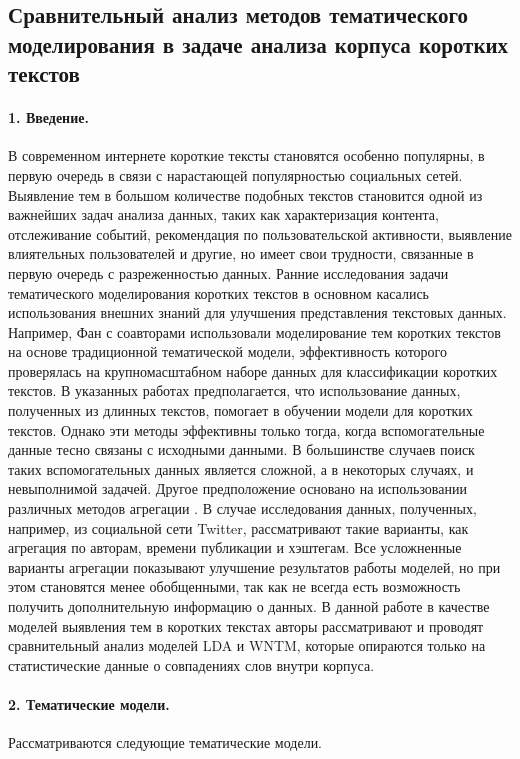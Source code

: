 \subsection{Сравнительный анализ методов тематического моделирования в задаче анализа корпуса коротких текстов}\label{subsec:ch5/sec2/sub7}

\paragraph{1. Введение.} В современном интернете короткие тексты становятся особенно популярны, в первую очередь в связи с нарастающей популярностью социальных сетей. Выявление тем в большом количестве подобных текстов становится одной из важнейших задач анализа данных, таких как характеризация контента, отслеживание событий, рекомендация по пользовательской активности, выявление влиятельных пользователей и другие, но имеет свои трудности, связанные в первую очередь с разреженностью данных. Ранние исследования задачи тематического моделирования коротких текстов в основном касались использования внешних знаний для улучшения представления текстовых данных. Например, Фан с соавторами \cite{HoriguchiPhanNguyen} использовали моделирование тем коротких текстов на основе традиционной тематической модели, эффективность которого проверялась на крупномасштабном наборе данных для классификации коротких текстов. В указанных работах предполагается, что использование данных, полученных из длинных текстов, помогает в обучении модели для коротких текстов. Однако эти методы эффективны только тогда, когда вспомогательные данные тесно связаны с исходными данными. В большинстве случаев поиск таких вспомогательных данных является сложной, а в некоторых случаях, и невыполнимой задачей. Другое предположение основано на использовании различных методов агрегации \cite{WrayLexingRishabh}. В случае исследования данных, полученных, например, из социальной сети Twitter, рассматривают такие варианты, как агрегация по авторам, времени публикации и хэштегам. Все усложненные варианты агрегации показывают улучшение результатов работы моделей, но при этом становятся менее обобщенными, так как не всегда есть возможность получить дополнительную информацию о данных. В данной работе в качестве моделей выявления тем в коротких текстах авторы рассматривают и проводят сравнительный анализ моделей LDA и WNTM, которые опираются только на статистические данные о совпадениях слов внутри корпуса.

\paragraph{2. Тематические модели.} Рассматриваются следующие тематические модели.

